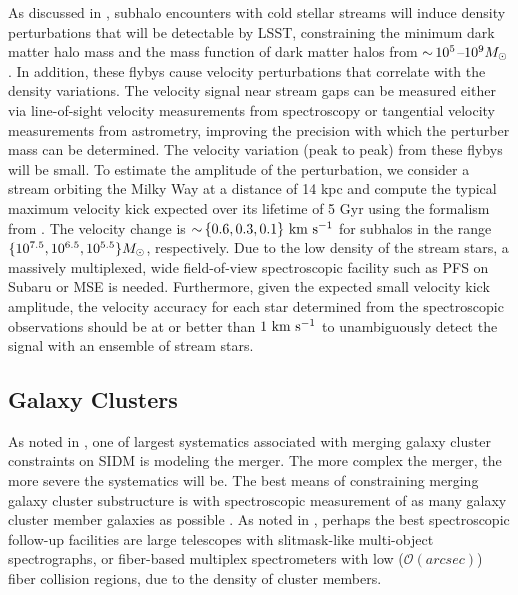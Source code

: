 As discussed in , subhalo encounters with cold stellar streams will induce density perturbations that will be detectable by LSST, constraining the minimum dark matter halo mass and the mass function of dark matter halos from $ {\sim}\,10^5$--$10^9 M_\odot$. In addition, these flybys cause velocity perturbations that correlate with the density variations.  The velocity signal near stream gaps can be measured either via line-of-sight velocity measurements from spectroscopy or tangential velocity measurements from astrometry, improving the precision with which the perturber mass can be determined.
The velocity variation (peak to peak) from these flybys will be small. To estimate the amplitude of the perturbation, we consider a stream orbiting the Milky Way at a distance of 14 kpc and compute the typical maximum velocity kick expected over its lifetime of 5 Gyr using the formalism from \citet{erkal2016}.  The velocity change is $ {\sim}\, \{0.6, 0.3, 0.1\} \mathrm{\,\mathrm{\,km}\,\mathrm{\,s}^{-1}}$ for subhalos in the range $\{ 10^{7.5}, 10^{6.5}, 10^{5.5} \} M_\odot$, respectively. %
Due to the low density of the stream stars, a massively multiplexed, wide field-of-view spectroscopic facility such as PFS on Subaru or MSE is needed. Furthermore, given the expected small velocity kick amplitude, the velocity accuracy for each star determined from the spectroscopic observations should be at or better than $1 \mathrm{\,\mathrm{\,km}\,\mathrm{\,s}^{-1}}$ to unambiguously detect the signal with an ensemble of stream stars. 

\subsection{Galaxy Clusters }
As noted in , one of largest systematics associated with merging galaxy cluster constraints on SIDM is modeling the merger. The more complex the merger, the more severe the systematics will be.
The best means of constraining merging galaxy cluster substructure is with spectroscopic measurement of as many galaxy cluster member galaxies as possible \citep[\eg,][]{Golovich:2018}.
As noted in \citet{2016arXiv161001661N}, perhaps the best spectroscopic follow-up facilities are large telescopes with slitmask-like multi-object spectrographs, or fiber-based multiplex spectrometers with low ($\mathcal{O}(\unit{arcsec})$) fiber collision regions, due to the density of cluster members.

